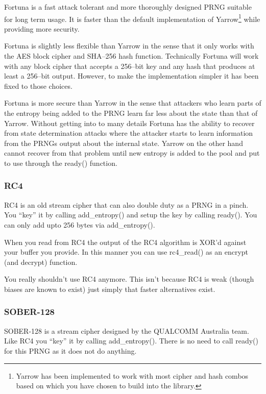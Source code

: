 \documentclass[a4paper]{book}
\begin{document}
Fortuna is a fast attack tolerant and more thoroughly designed PRNG suitable for long term
usage.  It is faster than the default implementation of Yarrow\footnote{Yarrow has been implemented
to work with most cipher and hash combos based on which you have chosen to build into the library.} while
providing more security.  

Fortuna is slightly less flexible than Yarrow in the sense that it only works with the AES block cipher 
and SHA--256 hash function.  Technically Fortuna will work with any block cipher that accepts a 256--bit
key and any hash that produces at least a 256--bit output.  However, to make the implementation simpler
it has been fixed to those choices.

Fortuna is more secure than Yarrow in the sense that attackers who learn parts of the entropy being 
added to the PRNG learn far less about the state than that of Yarrow.  Without getting into to many
details Fortuna has the ability to recover from state determination attacks where the attacker starts
to learn information from the PRNGs output about the internal state.  Yarrow on the other hand cannot 
recover from that problem until new entropy is added to the pool and put to use through the ready() function.

\subsubsection{RC4}

RC4 is an old stream cipher that can also double duty as a PRNG in a pinch.  You ``key'' it by
calling add\_entropy() and setup the key by calling ready().  You can only add upto 256 bytes via
add\_entropy().  

When you read from RC4 the output of the RC4 algorithm is XOR'd against your buffer you provide.  In this
manner you can use rc4\_read() as an encrypt (and decrypt) function.  

You really shouldn't use RC4 anymore.  This isn't because RC4 is weak (though biases are known to exist) just
simply that faster alternatives exist.

\subsubsection{SOBER-128}

SOBER-128 is a stream cipher designed by the QUALCOMM Australia team.  Like RC4 you ``key'' it by 
calling add\_entropy().  There is no need to call ready() for this PRNG as it does not do anything.  
\end{document}
